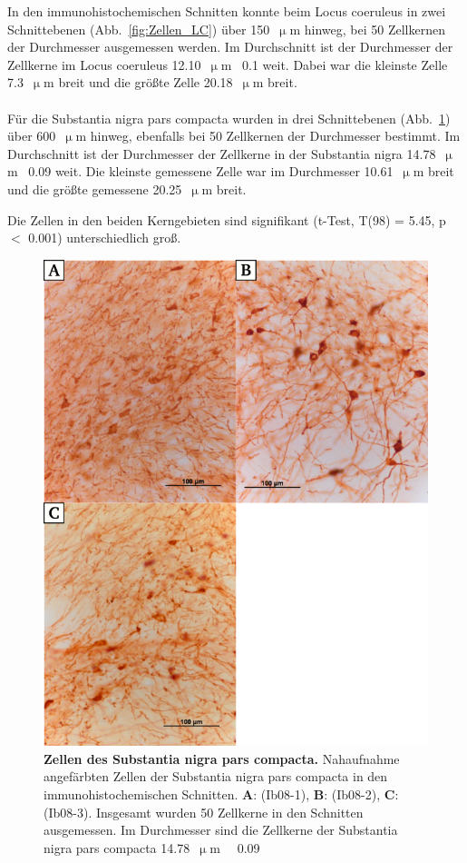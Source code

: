 \documentclass[12pt,a4paper,pdftex]{article}
\newcommand{\rpm}{\raisebox{.2ex}{$\scriptstyle\pm$} }
\begin{document}
\newpage
In den immunohistochemischen Schnitten konnte beim Locus coeruleus  in zwei Schnittebenen (Abb.~\ref{fig:Zellen_LC}) über 150~$\upmu$m hinweg, bei 50 Zellkernen der Durchmesser ausgemessen werden. Im Durchschnitt ist der Durchmesser der Zellkerne im Locus coeruleus 12.10~$\upmu$m~\rpm0.1 weit. Dabei war die kleinste Zelle 7.3~$\upmu$m breit und die größte Zelle 20.18~$\upmu$m breit.
\\
\\
Für die Substantia nigra pars compacta  wurden in drei Schnittebenen (Abb.~\ref{fig:Zellen_SNC}) über 600~$\upmu$m hinweg, ebenfalls bei 50 Zellkernen der Durchmesser bestimmt. Im Durchschnitt ist der Durchmesser der Zellkerne in der Substantia nigra 14.78~$\upmu$m~\rpm0.09 weit. Die kleinste gemessene Zelle war im Durchmesser 10.61~$\upmu$m breit und die größte gemessene 20.25~$\upmu$m breit.

Die Zellen in den beiden Kerngebieten sind signifikant (t-Test, T(98) = 5.45, p $<$ 0.001) unterschiedlich groß.

\begin{figure}[H]
    \centering
    \includegraphics{pictures/Bilder_monoamine_systeme/Zellen_SNC.png}
    \caption[Zellen des Substantia nigra pars compacta]{\textbf{Zellen des Substantia nigra pars compacta.} Nahaufnahme angefärbten Zellen der Substantia nigra pars compacta in den immunohistochemischen Schnitten. \textbf{A}: (Ib08-1), \textbf{B}: (Ib08-2), \textbf{C}: (Ib08-3). Insgesamt wurden 50 Zellkerne in den Schnitten ausgemessen. Im Durchmesser sind die Zellkerne der Substantia nigra pars compacta 14.78~$\upmu$m~\rpm~0.09}
    \label{fig:Zellen_SNC}
\end{figure}
\end{document}
